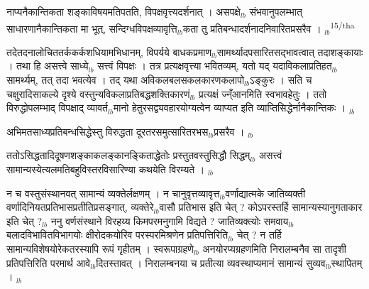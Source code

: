 \documentclass[article,12pt,a4paper]{memoir}%
\newcounter{parCount}
\begin{document}
	  
	  \pstart \leavevmode%
	नाप्यनैकान्तिकता शङ्काविषयमतिपतति, विपक्षवृत्त्यदर्शनात् । असपक्षे{\tiny $_{lb}$} संभवानुपलम्भात् साधारणानैकान्तिकता मा भूत्, सन्दिग्धविपक्षव्यावृत्ति{\tiny $_{lb}$}कता तु प्रतिबन्धादर्शनादनिवारितप्रसरैव ।
	{}
	\pend%
      {\tiny $_{lb}$}\textsuperscript{\textenglish{15/tha}}

	  
	  \pstart \leavevmode%
	तदेतदनालोचिततर्ककर्कशधियामभिधानम्, विपर्यये बाधकप्रमाण{\tiny $_{lb}$}सामर्थ्यादप\leavevmode{}सारितसद्भावत्वात् तदाशङ्कायाः । तथा हि असत्त्वे साध्ये{\tiny $_{lb}$} सत्त्वं विपक्षः । तत्र प्रत्यक्षवृत्त्या भवितव्यम्, यतो यद् यदाविकलाप्रतिहत{\tiny $_{lb}$}सामर्थ्यम्, तत् तदा भवत्येव । तद् यथा अविकलबलसकलकारणकलापो{\tiny $_{lb}$}ऽङ्कुरः । सति च चक्षुरादिसाकल्ये दृश्ये वस्तुन्यविकलाप्रतिबद्धशक्तिकारणं{\tiny $_{lb}$} प्रत्यक्षं ज्न्ँआनमिति स्वभावहेतुः । ततो विरुद्धोपलम्भाद् विपक्षाद् व्यावर्त{\tiny $_{lb}$}मानो हेतुरसद्व्यवहारयोग्यत्वेन व्याप्यत इति व्याप्तिसिद्धेर्नानैकान्तिकः ।
	{}
	\pend%
      {\tiny $_{lb}$}

	  
	  \pstart \leavevmode%
	अभिमतसाध्यप्रतिबन्धसिद्धेस्तु विरुद्धता दूरतरसमुत्सारितरभस{\tiny $_{lb}$}प्रसरैव ।
	{}
	\pend%
      {\tiny $_{lb}$}

	  
	  \pstart \leavevmode%
	ततोऽसिद्धतादिदूषणशङ्काकलङ्कानङ्किताद्धेतोः प्रस्तुतवस्तुसिद्धौ सिद्धम्{\tiny $_{lb}$} असत्त्वं सामान्यस्येत्यलमतिबहुविस्तरविसारिण्या कथयेति विरम्यते ।
	{}
	\pend%
      {\tiny $_{lb}$}

	  
	  \pstart \leavevmode%
	न च वस्तुसंस्थानवत् सामान्यं व्यक्तेर्लक्षणम् । न चानुवृत्तव्यावृत्त{\tiny $_{lb}$}वर्णाद्यात्मके जातिव्यक्ती वर्णादिनियतप्रतिभासप्रतीतिप्रसङ्गात्, व्यक्तेरे{\tiny $_{lb}$}वासौ प्रतिभास इति चेत् ? कोऽपरस्तर्हि सामान्यस्यानुगताकार इति चेत् ?{\tiny $_{lb}$} ननु वर्णसंस्थाने विरहय्य किमपरमनुगामि विद्यते ? जातिव्यक्त्योः समवाय{\tiny $_{lb}$}बलादविभावितविभागयोः क्षीरोदकयोरिव परस्परमिश्रणेन प्रतिपत्तिरिति{\tiny $_{lb}$} चेत् ? न तर्हि सामान्यविशेषयोरेकतरस्यापि रूपं गृहीतम् । स्वरूपाग्रहणे{\tiny $_{lb}$} अनयोरप्यग्रहणमिति निरालम्बनैव सा तादृशी प्रतिपत्तिरिति परमार्थ आवे{\tiny $_{lb}$}दितस्तावत् । निरालम्बनया च प्रतीत्या व्यवस्थाप्यमानं सामान्यं सुव्यव{\tiny $_{lb}$}स्थापितम् ।
	{}
	\pend%
      {\tiny $_{lb}$}
	    
\end{document}
